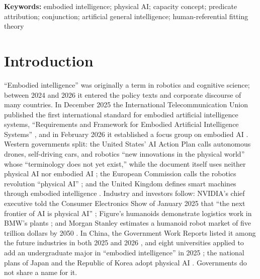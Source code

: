 \documentclass[10pt]{article}
\begin{document}
\medskip
\noindent\textbf{Keywords:} embodied intelligence; physical AI; capacity concept; predicate attribution; conjunction; artificial general intelligence; human-referential fitting theory

\section{Introduction}\label{sec:intro}

``Embodied intelligence'' was originally a term in robotics and cognitive science; between 2024 and 2026 it entered the policy texts and corporate discourse of many countries. In December 2025 the International Telecommunication Union published the first international standard for embodied artificial intelligence systems, ``Requirements and Framework for Embodied Artificial Intelligence Systems'' \cite{itu2025}, and in February 2026 it established a focus group on embodied AI \cite{caict2026}. Western governments split: the United States' AI Action Plan calls autonomous drones, self-driving cars, and robotics ``new innovations in the physical world'' whose ``terminology does not yet exist,'' while the document itself uses neither physical AI nor embodied AI \cite{aiaap2025}; the European Commission calls the robotics revolution ``physical AI'' \cite{eu2025}; and the United Kingdom defines smart machines through embodied intelligence \cite{uk2025}. Industry and investors follow: NVIDIA's chief executive told the Consumer Electronics Show of January 2025 that ``the next frontier of AI is physical AI'' \cite{ces2025}; Figure's humanoids demonstrate logistics work in BMW's plants \cite{figure_f03}; and Morgan Stanley estimates a humanoid robot market of five trillion dollars by 2050 \cite{morganstanley2025}. In China, the Government Work Reports listed it among the future industries in both 2025 and 2026 \cite{govreport2025,govreport2026}, and eight universities applied to add an undergraduate major in ``embodied intelligence'' in 2025 \cite{yicai2025}; the national plans of Japan and the Republic of Korea adopt physical AI \cite{japan2026,korea2026}. Governments do not share a name for it.
\end{document}
